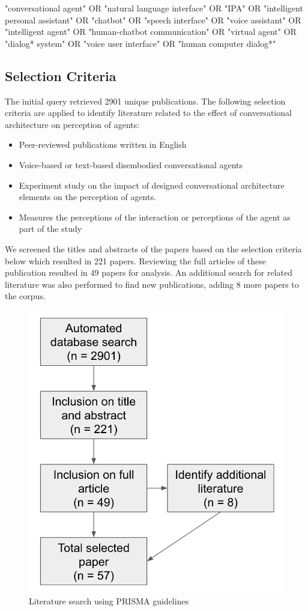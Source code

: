 \documentclass[sigconf,screen,review, anonymous]{acmart}
\begin{document}
\begin{mdframed}
"conversational agent" OR "natural language interface" OR "IPA" OR "intelligent personal assistant" OR "chatbot" OR "speech interface" OR "voice assistant" OR "intelligent agent" OR "human-chatbot communication" OR "virtual agent" OR "dialog* system" OR "voice user interface" OR "human computer dialog*"
\end{mdframed}

\subsection{Selection Criteria}
The initial query retrieved 2901 unique publications. The following selection criteria are applied to identify literature related to the effect of conversational architecture on perception of agents:
\begin{itemize}
  \item Peer-reviewed publications written in English
  \item Voice-based or text-based disembodied conversational agents
  \item Experiment study on the impact of designed conversational architecture elements on the perception of agents.
  \item Measures the perceptions of the interaction or perceptions of the agent as part of the study
\end{itemize}

We screened the titles and abstracts of the papers based on the selection criteria below which resulted in 221 papers. Reviewing the full articles of these publication resulted in 49 papers for analysis. An additional search for related literature was also performed to find new publications, adding 8 more papers to the corpus.

\begin{figure}[h]
  \centering
  \includegraphics[width=0.6\columnwidth]{fig-prisma.png}
  \caption{Literature search using PRISMA guidelines}
  \label{fig:prisma}
\end{figure}
\end{document}
